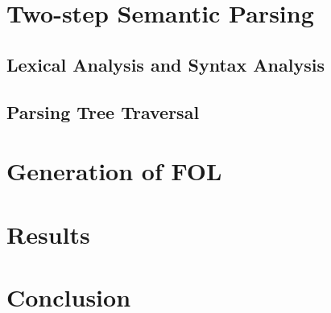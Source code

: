 \documentclass{article}
\begin{document}
\section{Two-step Semantic Parsing}{
	\subsection{Lexical Analysis and Syntax Analysis}{}

	\subsection{Parsing Tree Traversal}{}
}

\section{Generation of FOL}{}

\section{Results}{}

\section{Conclusion}{}



\citation
\end{document}
